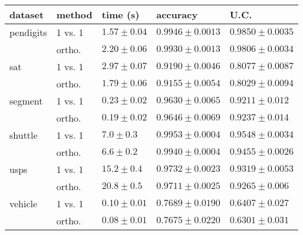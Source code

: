 \begin{tabular}{|ll|lll|}
\hline
dataset   & method  & time (s) & accuracy & U.C. \\\hline\hline
pendigits & 1 vs. 1 & $\mathbf{1.57\pm 0.04}$ &$\mathbf{0.9946\pm0.0013}$ &$\mathbf{0.9850\pm0.0035}$ \\
          & ortho.  & $      2.20\pm    0.06$ & $     0.9930\pm   0.0013$ & $     0.9806\pm   0.0034$ \\\hline
sat       & 1 vs. 1 & $       2.97\pm    0.07$ & $\mathbf{0.9190\pm0.0046}$ & $\mathbf{0.8077\pm0.0087}$ \\
          & ortho.  & $\mathbf{1.79\pm 0.06}$ & $     0.9155\pm   0.0054$ & $    0.8029\pm   0.0094$ \\\hline
segment   & 1 vs. 1 & $       0.23\pm    0.02$ & $    0.9630\pm   0.0065$ & $    0.9211\pm    0.012$ \\
          & ortho.  & $\mathbf{0.19\pm  0.02}$ & $\mathbf{0.9646\pm0.0069}$ & $\mathbf{0.9237\pm0.014}$ \\\hline
shuttle   & 1 vs. 1 & $     7.0\pm   0.3$ & $\mathbf{0.9953\pm0.0004}$& $\mathbf{0.9548\pm  0.0034}$ \\
          & ortho.  & $\mathbf{6.6\pm    0.2}$& $    0.9940\pm  0.0004$ & $    0.9455\pm   0.0026$ \\\hline
usps      & 1 vs. 1 & $\mathbf{15.2\pm   0.4}$ &$\mathbf{0.9732\pm0.0023}$ &$\mathbf{0.9319\pm0.0053}$ \\
          & ortho.  & $      20.8\pm      0.5$ & $     0.9711\pm   0.0025$ & $     0.9265\pm    0.006$ \\\hline
vehicle   & 1 vs. 1 & $      0.10\pm    0.01$ & $\mathbf{0.7689\pm0.0190}$ & $\mathbf{0.6407\pm    0.027}$ \\
          & ortho.  & $\mathbf{0.08\pm0.01}$ & $    0.7675\pm    0.0220$ & $    0.6301\pm    0.031$ \\\hline
\end{tabular}
